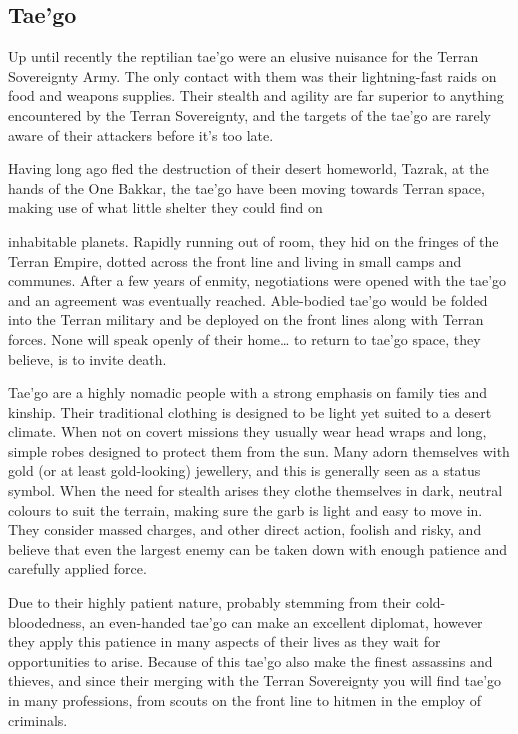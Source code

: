 \subsection{Tae'go}

Up until recently the reptilian tae'go were an elusive nuisance for the Terran Sovereignty Army. The only contact with them was their lightning-fast raids on food and weapons supplies. Their stealth and agility are far superior to anything encountered by the Terran Sovereignty, and the targets of the tae'go are rarely aware of their attackers before it's too late.

Having long ago fled the destruction of their desert homeworld, Tazrak, at the hands of the One Bakkar, the tae'go have been moving towards Terran space, making use of what little shelter they could find on

inhabitable planets. Rapidly running out of room, they hid on the fringes of the Terran Empire, dotted across the front line and living in small camps and communes. After a few years of enmity, negotiations were opened with the tae'go and an agreement was eventually reached. Able-bodied tae'go would be folded into the Terran military and be deployed on the front lines along with Terran forces. None will speak openly of their home{\dots} to return to tae'go space, they believe, is to invite death.

Tae'go are a highly nomadic people with a strong emphasis on family ties and kinship. Their traditional clothing is designed to be light yet suited to a desert climate. When not on covert missions they usually wear head wraps and long, simple robes designed to protect them from the sun. Many adorn themselves with gold (or at least gold-looking) jewellery, and this is generally seen as a status symbol. When the need for stealth arises they clothe themselves in dark, neutral colours to suit the terrain, making sure the garb is light and easy to move in. They consider massed charges, and other direct action, foolish and risky, and believe that even the largest enemy can be taken down with enough patience and carefully applied force.

Due to their highly patient nature, probably stemming from their cold-bloodedness, an even-handed tae'go can make an excellent diplomat, however they apply this patience in many aspects of their lives as they wait for opportunities to arise. Because of this tae'go also make the finest assassins and thieves, and since their merging with the Terran Sovereignty you will find tae'go in many professions, from scouts on the front line to hitmen in the employ of criminals.

